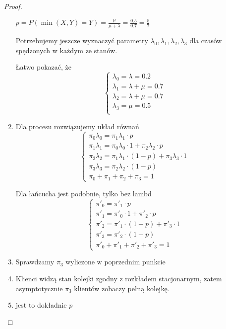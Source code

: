 \begin{proof}
\begin{enumerate}
		      \( p = P(\min(X, Y) = Y) = \frac{\mu}{\mu + \lambda} = \frac{0.5}{0.7} = \frac{5}{7} \)

		      Potrzebujemy jeszcze wyznaczyć parametry \( \lambda_0, \lambda_1, \lambda_2, \lambda_3 \) dla czasów spędzonych w każdym ze stanów.

		      Łatwo pokazać, że \[
			      \begin{cases}
				      \lambda_0 = \lambda = 0.2       \\
				      \lambda_1 = \lambda + \mu = 0.7 \\
				      \lambda_2 = \lambda + \mu = 0.7 \\
				      \lambda_3 = \mu = 0.5           \\
			      \end{cases}
		      \]

		\item
		      Dla procesu rozwiązujemy układ równań
		      \[
			      \begin{cases}
				      \pi_0 \lambda_0 = \pi_1 \lambda_1 \cdot p                                 \\
				      \pi_1 \lambda_1 = \pi_0 \lambda_0 \cdot 1 + \pi_2 \lambda_2 \cdot p       \\
				      \pi_2 \lambda_2 = \pi_1 \lambda_1 \cdot (1 - p) + \pi_3 \lambda_3 \cdot 1 \\
				      \pi_3 \lambda_3 = \pi_2 \lambda_2 \cdot (1 - p)                           \\
				      \pi_0 + \pi_1 + \pi_2 + \pi_3 = 1
			      \end{cases}
		      \]

		      Dla łańcucha jest podobnie, tylko bez lambd
		      \[
			      \begin{cases}
				      \pi'_0 = \pi'_1 \cdot p                        \\
				      \pi'_1 = \pi'_0 \cdot 1 + \pi'_2 \cdot p       \\
				      \pi'_2 = \pi'_1 \cdot (1 - p) + \pi'_3 \cdot 1 \\
				      \pi'_3 = \pi'_2 \cdot (1 - p)                  \\
				      \pi'_0 + \pi'_1 + \pi'_2 + \pi'_3 = 1
			      \end{cases}
		      \]

		\item Sprawdzamy \( \pi_3 \) wyliczone w poprzednim punkcie

		\item Klienci widzą stan kolejki zgodny z rozkładem stacjonarnym, zatem asymptotycznie \( \pi_3 \) klientów zobaczy pełną kolejkę.

		\item jest to dokładnie \( p \)

	\end{enumerate}
\end{proof}